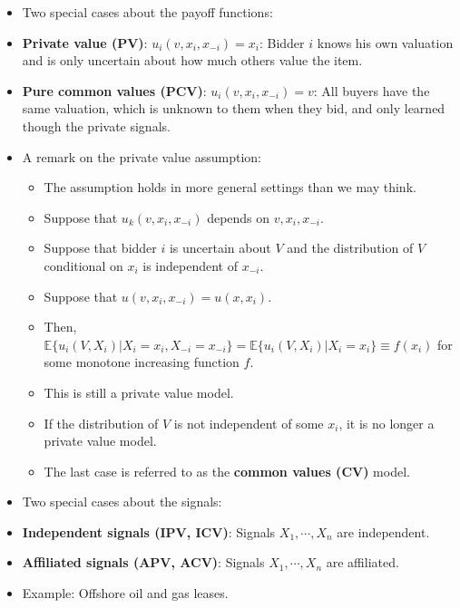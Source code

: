 \documentclass[]{book}
\providecommand{\tightlist}{%
  \setlength{\itemsep}{0pt}\setlength{\parskip}{0pt}}
\begin{document}
\begin{itemize}
\tightlist
\item
  Two special cases about the payoff functions:
\item
  \textbf{Private value (PV)}: \(u_i(v, x_i, x_{-i}) = x_i\): Bidder
  \(i\) knows his own valuation and is only uncertain about how much
  others value the item.
\item
  \textbf{Pure common values (PCV)}: \(u_i(v, x_i, x_{-i}) = v\): All
  buyers have the same valuation, which is unknown to them when they
  bid, and only learned though the private signals.
\item
  A remark on the private value assumption:

  \begin{itemize}
  \tightlist
  \item
    The assumption holds in more general settings than we may think.
  \item
    Suppose that \(u_k(v, x_i, x_{-i})\) depends on \(v, x_i, x_{-i}\).
  \item
    Suppose that bidder \(i\) is uncertain about \(V\) and the
    distribution of \(V\) conditional on \(x_i\) is independent of
    \(x_{-i}\).
  \item
    Suppose that \(u(v, x_i, x_{-i}) = u(x, x_i)\).
  \item
    Then,
    \(\mathbb{E}\{u_i(V, X_i)|X_i = x_i, X_{-i} = x_{-i}\} = \mathbb{E}\{u_i(V, X_i)|X_i = x_i\} \equiv f(x_i)\)
    for some monotone increasing function \(f\).
  \item
    This is still a private value model.
  \item
    If the distribution of \(V\) is not independent of some \(x_i\), it
    is no longer a private value model.
  \item
    The last case is referred to as the \textbf{common values (CV)}
    model.
  \end{itemize}
\item
  Two special cases about the signals:
\item
  \textbf{Independent signals (IPV, ICV)}: Signals \(X_1, \cdots, X_n\)
  are independent.
\item
  \textbf{Affiliated signals (APV, ACV)}: Signals \(X_1, \cdots, X_n\)
  are affiliated.
\item
  Example: Offshore oil and gas leases.


\end{itemize}
\end{document}

